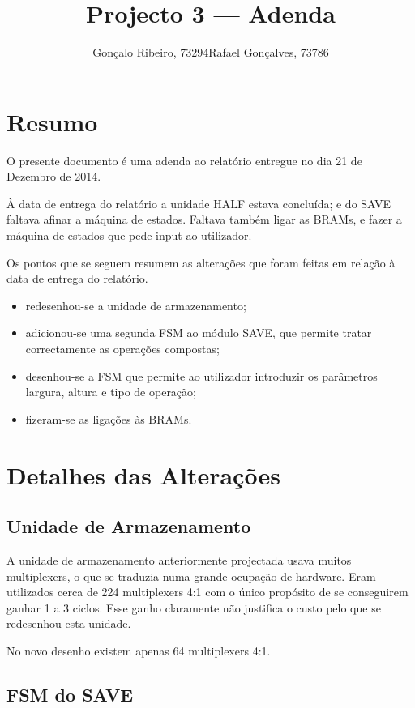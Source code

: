 \documentclass[a4paper]{article}
\title{Projecto 3 --- Adenda}
\author{Gonçalo Ribeiro, 73294\hspace{8mm}Rafael Gonçalves, 73786}
\begin{document}
\maketitle
%


\section{Resumo}
O presente documento é uma adenda ao relatório entregue no dia 21 de Dezembro de 2014.

À data de entrega do relatório a unidade HALF estava concluída; e do SAVE faltava afinar a máquina de estados. Faltava também ligar as BRAMs, e fazer a máquina de estados que pede input ao utilizador.

Os pontos que se seguem resumem as alterações que foram feitas em relação à data de entrega do relatório.

\begin{itemize}
	\item redesenhou-se a unidade de armazenamento;
	\item adicionou-se uma segunda FSM ao módulo SAVE, que permite tratar correctamente as operações compostas;
	\item desenhou-se a FSM que permite ao utilizador introduzir os parâmetros largura, altura e tipo de operação;
	\item fizeram-se as ligações às BRAMs.
\end{itemize}

\section{Detalhes das Alterações}

\subsection*{Unidade de Armazenamento}
A unidade de armazenamento anteriormente projectada usava muitos multiplexers, o que se traduzia numa grande ocupação de hardware. Eram utilizados cerca de 224 multiplexers 4:1 com o único propósito de se conseguirem ganhar 1 a 3 ciclos. Esse ganho claramente não justifica o custo pelo que se redesenhou esta unidade.

No novo desenho existem apenas 64 multiplexers 4:1.

\subsection*{FSM do SAVE}
\end{document}
